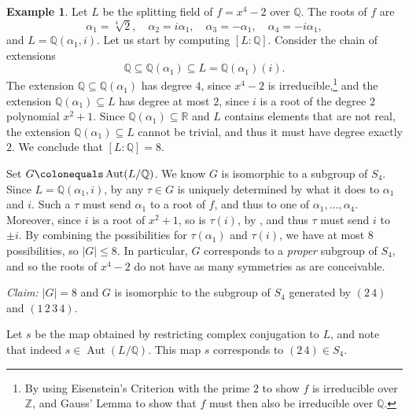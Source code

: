 \documentclass[12pt]{report}
\numberwithin{equation}{section}
\numberwithin{theorem}{chapter}
\theoremstyle{definition}
\newtheorem{example}[theorem]{Example}
\newtheorem*{basic properties}{Basic Properties}
\newtheorem*{Important Remark}{Important Remark}
\newcommand{\R}{\mathbb{R}}
\newcommand{\Z}{\mathbb{Z}}
\newcommand{\Q}{\mathbb{Q}}
\DeclareMathOperator{\Aut}{Aut}
\begin{document}
\begin{example}\label{example galois}
Let $L$ be the splitting field of $f = x^4-2$ over $\Q$. The roots of $f$ are 
$$\alpha_1 = \sqrt[4]{2}, \quad \alpha_2 = i \alpha_1, \quad \alpha_3 = - \alpha_1, \quad \alpha_4 = -i \alpha_1,$$
and $L = \Q(\alpha_1, i)$. Let us start by computing $[L:\Q]$. Consider the chain of extensions
$$\Q \subseteq \Q(\alpha_1) \subseteq L = \Q(\alpha_1)(i).$$
The extension $\Q \subseteq \Q(\alpha_1)$ has degree $4$, since $x^4 - 2$ is irreducible,\footnote{By using Eisenstein's Criterion with the prime $2$ to show $f$ is irreducible over $\Z$, and Gauss' Lemma to show that $f$ must then also be irreducible over $\Q$.} and the extension $\Q(\alpha_1) \subseteq L$ has degree at most $2$, since $i$ is a root of the degree $2$ polynomial $x^2+1$.
Since $\Q(\alpha_1) \subseteq \R$ and $L$ contains elements that are not real, the extension $\Q(\alpha_1) \subseteq L$ cannot be trivial, and thus it must have degree exactly $2$. We conclude that $[L:\Q] = 8$.



Set $G \colonequals \Aut(L/\Q)$. We know $G$ is isomorphic to a subgroup of $S_4$. Since $L= \Q(\alpha_1, i)$, by  any $\tau \in G$ is uniquely determined by what it does to $\alpha_1$ and $i$. Such a $\tau$ must send $\alpha_1$ to a root of $f$, and thus to one of $\alpha_1, \ldots, \alpha_4$. Moreover, since $i$ is a root of $x^2 + 1$, so is $\tau(i)$, by , and thus $\tau$ must send $i$ to $\pm i$. By combining the possibilities for $\tau(\alpha_1)$ and $\tau(i)$, we have at most $8$ possibilities, so $|G| \leqslant 8$. In particular, $G$ corresponds to a {\em proper} subgroup of $S_4$, and so the roots of $x^4-2$ do not have as many symmetries as are conceivable.

{\em Claim:} $|G| = 8$ and $G$ is isomorphic to the subgroup of $S_4$ generated by $(2 \, 4)$ and $(1 \,2 \, 3 \,4)$. 

Let $s$ be the map obtained by restricting complex conjugation to $L$, and note that indeed $s \in \Aut(L/\Q)$. This map $s$ corresponds to $(2 \, 4) \in S_4$.


\end{example}
\end{document}
